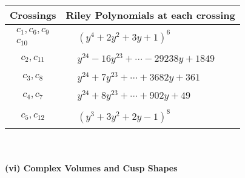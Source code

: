 \documentclass[1p]{elsarticle_modified}
\theoremstyle{definition}
\begin{document}
\begin{tabular}{m{50pt}|m{274pt}}
Crossings & \hspace{64pt}Riley Polynomials at each crossing \\
\hline $$\begin{aligned}c_{1},c_{6},c_{9}\\c_{10}\end{aligned}$$&$\begin{aligned}
&(y^4+2 y^2+3 y+1)^6
\end{aligned}$\\
\hline $$\begin{aligned}c_{2},c_{11}\end{aligned}$$&$\begin{aligned}
&y^{24}-16 y^{23}+\cdots-29238 y+1849
\end{aligned}$\\
\hline $$\begin{aligned}c_{3},c_{8}\end{aligned}$$&$\begin{aligned}
&y^{24}+7 y^{23}+\cdots+3682 y+361
\end{aligned}$\\
\hline $$\begin{aligned}c_{4},c_{7}\end{aligned}$$&$\begin{aligned}
&y^{24}+8 y^{23}+\cdots+902 y+49
\end{aligned}$\\
\hline $$\begin{aligned}c_{5},c_{12}\end{aligned}$$&$\begin{aligned}
&(y^3+3 y^2+2 y-1)^8
\end{aligned}$\\
\hline
\end{tabular}\\~\\
\newpage\flushleft \textbf{(vi) Complex Volumes and Cusp Shapes}
\end{document}
